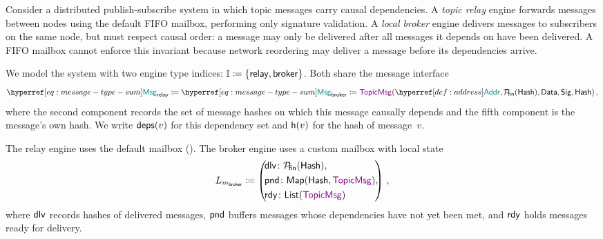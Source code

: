 
\begin{example}\label{ex:causal-mailbox}\sloppy%
  Consider a distributed publish-subscribe system in which topic messages
  carry causal dependencies. A \emph{topic relay} engine forwards messages
  between nodes using the default FIFO mailbox, performing only signature
  validation. A \emph{local broker} engine delivers messages to subscribers
  on the same node, but must respect causal order: a message may only be
  delivered after all messages it depends on have been delivered. A FIFO
  mailbox cannot enforce this invariant because network reordering may
  deliver a message before its dependencies arrive.

  We model the system with two engine type indices:
  $\mathbb{I} \coloneqq \{ \mathsf{relay}, \mathsf{broker} \}$.
  Both share the message interface
  \begin{equation}\label{eq:topic-msg}
    \typedef{%
      \msgtype{\mathsf{relay}}%
    }{%
      \msgtype{\mathsf{broker}}%
    } \coloneqq
      \msg{TopicMsg}(\Address, \FinSet{\mathsf{Hash}}, \mathsf{Data},
      \mathsf{Sig}, \mathsf{Hash})\,,
  \end{equation}
  where the second component records the set of message hashes on which this
  message causally depends and the fifth component is the message's own hash.
  We write $\mathsf{deps}(v)$ for this dependency set
  and $\mathsf{h}(v)$ for the hash of message~$v$.

  The relay engine uses the default mailbox ().
  The broker engine uses a custom mailbox with local state
  \begin{equation}\label{eq:causal-state}
    \typedef{%
      L_{\mailbox{\mathsf{broker}}}%
    }{\left(\!\!
    \begin{aligned}
      & \fdlv \colon \FinSet{\mathsf{Hash}},\\
      & \fpnd \colon \Map{\mathsf{Hash}}{\msg{TopicMsg}},\\
      & \frdy \colon \List{\msg{TopicMsg}}
    \end{aligned}
    \!\!\right)}\,,
  \end{equation}
  where $\mathsf{dlv}$ records hashes of delivered messages,
  $\mathsf{pnd}$ buffers messages whose dependencies have not yet been met,
  and $\mathsf{rdy}$ holds messages ready for delivery.


\end{example}
